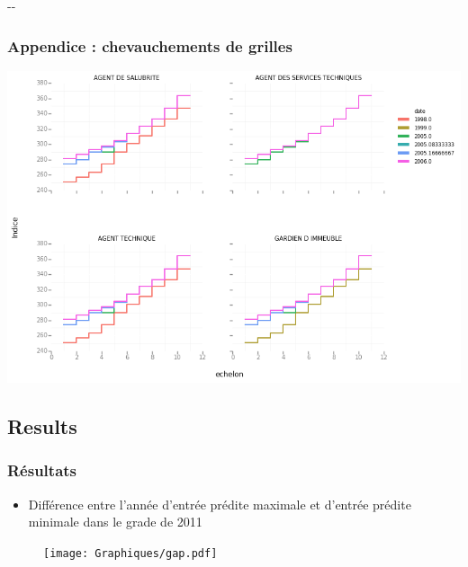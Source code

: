 \documentclass[xcolor=table,ignorenonframetext,12pt]{beamer}
\newlength{\offsetpage}
\newenvironment{widepage}{\begin{adjustwidth}{-\offsetpage}{-\offsetpage}%
		\addtolength{\textwidth}{2\offsetpage}}%
	{\end{adjustwidth}}
\begin{document}
\begin{frame}
\begin{widepage}
\begin{center}
{
}

\end{center}

\end{widepage}
\begin{flushright}
	\hyperlink{chevauchements}{}
\end{flushright}

\end{frame}

\begin{frame}[label = chevauchements]

\frametitle{Appendice : chevauchements de grilles}
\includegraphics[width=\textwidth]{Graphiques/chevauchements.png}

\end{frame}


\subsection{Results}
\begin{frame}
\frametitle{Résultats}
\begin{itemize}
\item Différence entre l'année d'entrée prédite maximale et d'entrée prédite minimale dans le grade de 2011
\end{itemize}
\begin{figure}
\vspace{-0.5cm}
\texttt{[image: Graphiques/gap.pdf]}
\end{figure}

\end{frame}
\end{document}

